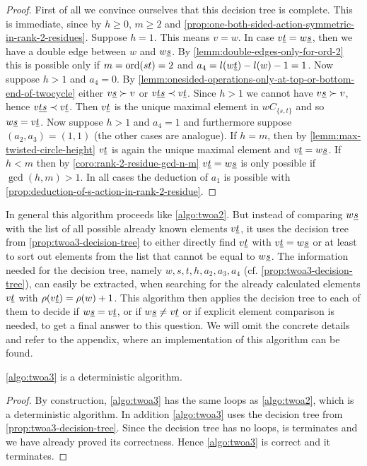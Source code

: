 \begin{prop}
	\begin{proof}
		First of all we convince ourselves that this decision tree is complete. This is immediate, since by $h \geq 0$, $m \geq 2$ and \ref{prop:one-both-sided-action-symmetric-in-rank-2-residues}. Suppose $h=1$. This means $v = w$. In case $v \underline{t} = w \underline{s}$, then we have a double edge between $w$ and $w \underline{s}$. By \ref{lemm:double-edges-only-for-ord-2} this is possible only if $m = \operatorname{ord}(st) = 2$ and $a_4 = l(w \underline{t}) - l(w) - 1 = 1$. Now suppose $h > 1$ and $a_4=0$. By \ref{lemm:onesided-operations-only-at-top-or-bottom-end-of-twocycle} either $v \underline{s} \succ v$ or $v \underline{t} \underline{s} \prec v \underline{t}$. Since $h > 1$ we cannot have $v \underline{s} \succ v$, hence $v \underline{t} \underline{s} \prec v \underline{t}$. Then $v \underline{t}$ is the unique maximal element in $wC_{\{s,t\}}$ and so $w \underline{s} = v \underline{t}$. Now suppose $h > 1$ and $a_4=1$ and furthermore suppose $(a_2,a_3)=(1,1)$ (the other cases are analogue). If $h = m$, then by \ref{lemm:max-twisted-circle-height} $v \underline{t}$ is again the unique maximal element and $v \underline{t} = w \underline{s}$. If $h < m$ then by \ref{coro:rank-2-residue-gcd-n-m} $v \underline{t} = w \underline{s}$ is only possible if $\gcd(h,m) > 1$. In all cases the deduction of $a_1$ is possible with \ref{prop:deduction-of-s-action-in-rank-2-residue}.
	\end{proof}
\end{prop}

\begin{algo}[TWOA3]
	In general this algorithm proceeds like \ref{algo:twoa2}. But instead of comparing $w \underline{s}$ with the list of all possible already known elements $v \underline{t}$, it uses the decision tree from \ref{prop:twoa3-decision-tree} to either directly find $v \underline{t}$ with $v \underline{t} = w \underline{s}$ or at least to sort out elements from the list that cannot be equal to $w \underline{s}$. The information needed for the decision tree, namely $w, s, t, h, a_2, a_3, a_4$ (cf. \ref{prop:twoa3-decision-tree}), can easily be extracted, when searching for the already calculated elements $v \underline{t}$ with $\rho(v \underline{t}) = \rho(w) + 1$. This algorithm then applies the decision tree to each of them to decide if $w \underline{s} = v \underline{t}$, or if $w \underline{s} \neq v \underline{t}$ or if explicit element comparison is needed, to get a final answer to this question. We will omit the concrete details and refer to the appendix, where an implementation of this algorithm can be found.
\end{algo}

\begin{lemm}
	\ref{algo:twoa3} is a deterministic algorithm.

	\begin{proof}
		By construction, \ref{algo:twoa3} has the same loops as \ref{algo:twoa2}, which is a deterministic algorithm. In addition \ref{algo:twoa3} uses the decision tree from \ref{prop:twoa3-decision-tree}. Since the decision tree has no loops, is terminates and we have already proved its correctness. Hence \ref{algo:twoa3} is correct and it terminates.
	\end{proof}
\end{lemm}

